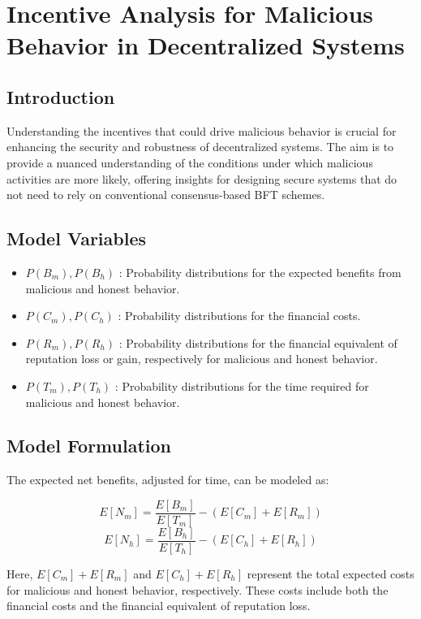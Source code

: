 \section{Incentive Analysis for Malicious Behavior in Decentralized Systems}

\subsection{Introduction}

Understanding the incentives that could drive malicious behavior is crucial for enhancing the security and robustness of decentralized systems. The aim is to provide a nuanced understanding of the conditions under which malicious activities are more likely, offering insights for designing secure systems that do not need to rely on conventional consensus-based BFT schemes.

\subsection{Model Variables}

\begin{itemize}
    \item \( P(B_m), P(B_h) \) : Probability distributions for the expected benefits from malicious and honest behavior.
    \item \( P(C_m), P(C_h) \) : Probability distributions for the financial costs.
    \item \( P(R_m), P(R_h) \) : Probability distributions for the financial equivalent of reputation loss or gain, respectively for malicious and honest behavior.
    \item \( P(T_m), P(T_h) \) : Probability distributions for the time required for malicious and honest behavior.
\end{itemize}

\subsection{Model Formulation}

The expected net benefits, adjusted for time, can be modeled as:

\[
    E[N_m] = \frac{E[B_m]}{E[T_m]} - (E[C_m] + E[R_m])
\]
\[
    E[N_h] = \frac{E[B_h]}{E[T_h]} - (E[C_h] + E[R_h])
\]

Here, \( E[C_m] + E[R_m] \) and \( E[C_h] + E[R_h] \) represent the total expected costs for malicious and honest behavior, respectively. These costs include both the financial costs and the financial equivalent of reputation loss.

